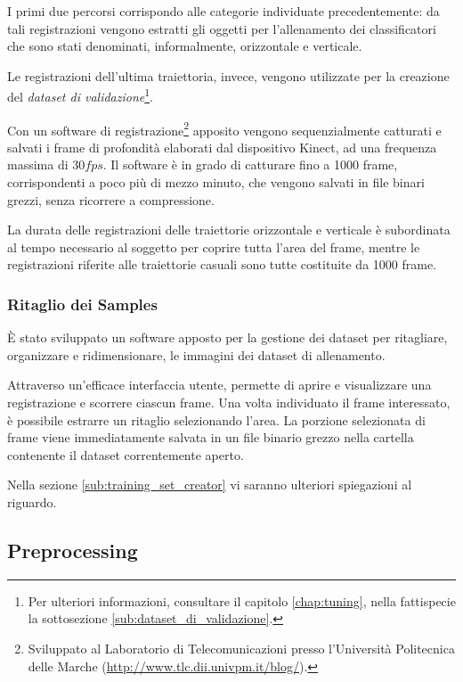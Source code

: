                 I primi due percorsi corrispondo alle categorie individuate precedentemente: da tali registrazioni vengono estratti gli oggetti per l'allenamento dei classificatori che sono stati denominati, informalmente, orizzontale e verticale.

                Le registrazioni dell'ultima traiettoria, invece, vengono utilizzate per la creazione del \emph{dataset di validazione}\footnote{Per ulteriori informazioni, consultare il capitolo \ref{chap:tuning}, nella fattispecie la sottosezione \ref{sub:dataset_di_validazione}.}.

                Con un software di registrazione\footnote{Sviluppato al Laboratorio di Telecomunicazioni presso l'Università Politecnica delle Marche (\url{http://www.tlc.dii.univpm.it/blog/}).} apposito vengono sequenzialmente catturati e salvati i frame di profondità elaborati dal dispositivo Kinect, ad una frequenza massima di $30 fps$.
                Il software è in grado di catturare fino a 1000 frame, corrispondenti a poco più di mezzo minuto, che vengono salvati in file binari grezzi, senza ricorrere a compressione.

                La durata delle registrazioni delle traiettorie orizzontale e verticale è subordinata al tempo necessario al soggetto per coprire tutta l'area del frame, mentre le registrazioni riferite alle traiettorie casuali sono tutte costituite da 1000 frame.

            \subsubsection{Ritaglio dei Samples}
                È stato sviluppato un software apposto per la gestione dei dataset per ritagliare, organizzare e ridimensionare, le immagini dei dataset di allenamento.

                Attraverso un'efficace interfaccia utente, permette di aprire e visualizzare una registrazione e scorrere ciascun frame. 
                Una volta individuato il frame interessato, è possibile estrarre un ritaglio selezionando l'area. 
                La porzione selezionata di frame viene immediatamente salvata in un file binario grezzo nella cartella contenente il dataset correntemente aperto.

                Nella sezione \ref{sub:training_set_creator} vi saranno ulteriori spiegazioni al riguardo.

        \subsection{Preprocessing}
        \label{sub:preprocessing}
